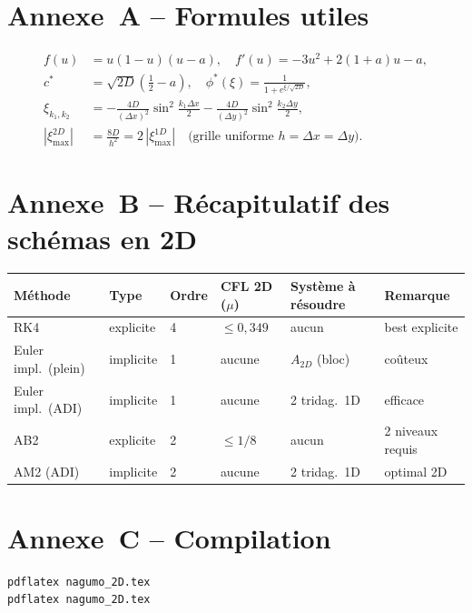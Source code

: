 \documentclass[11pt,a4paper]{report}
\begin{document}
\section*{Annexe~A -- Formules utiles}
\begin{align*}
  f(u)    &= u(1-u)(u-a),\quad f'(u)=-3u^2+2(1+a)u-a,\\
  c^*     &= \sqrt{2D}\!\left(\frac{1}{2}-a\right),\quad
  \phi^*(\xi)=\frac{1}{1+e^{\xi/\sqrt{2D}}},\\
  \xi_{k_1,k_2} &= -\frac{4D}{(\Delta x)^2}\sin^2\!\frac{k_1\Delta x}{2}
                   -\frac{4D}{(\Delta y)^2}\sin^2\!\frac{k_2\Delta y}{2},\\
  |\xi_{\max}^{2D}| &= \frac{8D}{h^2} = 2\,|\xi_{\max}^{1D}|
  \quad\text{(grille uniforme }h=\Delta x=\Delta y\text{)}.
\end{align*}

\section*{Annexe~B -- R\'ecapitulatif des sch\'emas en 2D}

\begin{longtable}{@{}p{2.8cm}p{1.8cm}p{1.2cm}p{1.5cm}p{3.5cm}p{3cm}@{}}
\toprule
M\'ethode & Type & Ordre & CFL 2D ($\mu$) & Syst\`eme \`a r\'esoudre & Remarque \\
\midrule
RK4                 & explicite & 4 & $\le 0{,}349$ & aucun   & best explicite \\
Euler impl.\ (plein)& implicite & 1 & aucune        & $A_{2D}$ (bloc) & co\^uteux \\
Euler impl.\ (ADI)  & implicite & 1 & aucune        & 2 tridag.\ 1D   & efficace  \\
AB2                 & explicite & 2 & $\le 1/8$     & aucun   & 2 niveaux requis \\
AM2 (ADI)           & implicite & 2 & aucune        & 2 tridag.\ 1D   & optimal 2D \\
\bottomrule
\end{longtable}

\section*{Annexe~C -- Compilation}
\begin{verbatim}
pdflatex nagumo_2D.tex
pdflatex nagumo_2D.tex
\end{verbatim}
\end{document}
